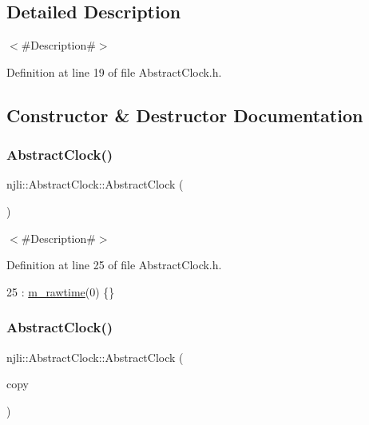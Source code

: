 \subsection{Detailed Description}
$<$\#\+Description\#$>$ 

Definition at line 19 of file Abstract\+Clock.\+h.



\subsection{Constructor \& Destructor Documentation}
\mbox{\label{classnjli_1_1_abstract_clock_adf1ecfb49abca618253d605ff43a212b}} 
\subsubsection{\texorpdfstring{Abstract\+Clock()}{AbstractClock()}\hspace{0.1cm}{\footnotesize\ttfamily [1/2]}}
{\footnotesize\ttfamily njli\+::\+Abstract\+Clock\+::\+Abstract\+Clock (\begin{DoxyParamCaption}{ }\end{DoxyParamCaption})\hspace{0.3cm}{\ttfamily [inline]}}

$<$\#\+Description\#$>$ 

Definition at line 25 of file Abstract\+Clock.\+h.


\begin{DoxyCode}
25 : \mbox{\hyperlink{classnjli_1_1_abstract_clock_a668e9ea61bf8c76643255af6b65f2a59}{m\_rawtime}}(0) \{\}
\end{DoxyCode}
\mbox{\label{classnjli_1_1_abstract_clock_a3c605a41c8f527a61c2226b2dba6bba4}} 
\subsubsection{\texorpdfstring{Abstract\+Clock()}{AbstractClock()}\hspace{0.1cm}{\footnotesize\ttfamily [2/2]}}
{\footnotesize\ttfamily njli\+::\+Abstract\+Clock\+::\+Abstract\+Clock (\begin{DoxyParamCaption}\item[{const \mbox{\hyperlink{classnjli_1_1_abstract_clock}{Abstract\+Clock}} \&}]{copy }\end{DoxyParamCaption})\hspace{0.3cm}{\ttfamily [inline]}}

